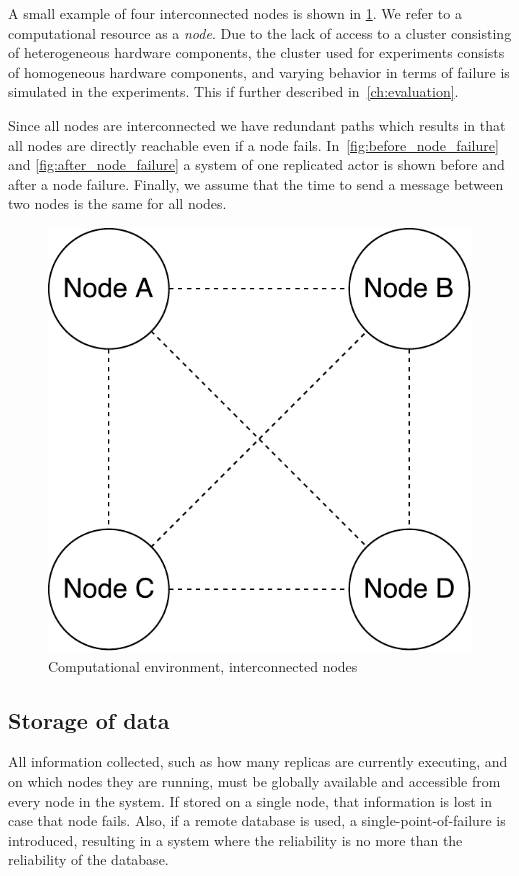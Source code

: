 \documentclass{cslthse-msc}
\begin{document}
A small example of four interconnected nodes is shown in \cref{fig:computational_environment}. We refer to a computational resource as a \emph{node}. Due to the lack of access to a cluster consisting of heterogeneous hardware components, the cluster used for experiments consists of homogeneous hardware components, and varying behavior in terms of failure is simulated in the experiments. This if further described in~\cref{ch:evaluation}.

Since all nodes are interconnected we have redundant paths which results in that all nodes are directly reachable even if a node fails. In~\cref{fig:before_node_failure} and \cref{fig:after_node_failure} a system of one replicated actor is shown before and after a node failure. Finally, we assume that the time to send a message between two nodes is the same for all nodes.

\begin{figure}[!hbt]
\centering
\includegraphics[scale=0.5]{images/computational_environment.pdf}
\caption{Computational environment, interconnected nodes} \label{fig:computational_environment}
\end{figure}

\subsection{Storage of data} \label{subsec:design_storage}
All information collected, such as how many replicas are currently executing, and on which nodes they are running, must be globally available and accessible from every node in the system. If stored on a single node, that information is lost in case that node fails. Also, if a remote database is used, a single-point-of-failure is introduced, resulting in a system where the reliability is no more than the reliability of the database. 
\end{document}
